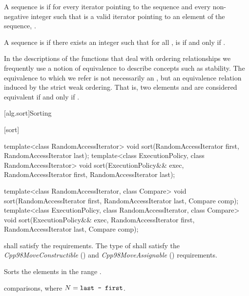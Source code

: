 \pnum
A sequence is
 if for every iterator
pointing to the sequence and every non-negative integer
such that
is a valid iterator pointing to an element of the sequence,
.

\pnum
A sequence
is
if there exists an integer
such that for all
,
is  if and only if
.

\pnum
In the descriptions of the functions that deal with ordering relationships we frequently use a notion of
equivalence to describe concepts such as stability.
The equivalence to which we refer is not necessarily an
,
but an equivalence relation induced by the strict weak ordering.
That is, two elements
and
are considered equivalent if and only if
.

[alg.sort]{Sorting}

[sort]{}

%
\begin{itemdecl}
template<class RandomAccessIterator>
  void sort(RandomAccessIterator first, RandomAccessIterator last);
template<class ExecutionPolicy, class RandomAccessIterator>
  void sort(ExecutionPolicy&& exec,
            RandomAccessIterator first, RandomAccessIterator last);

template<class RandomAccessIterator, class Compare>
  void sort(RandomAccessIterator first, RandomAccessIterator last,
            Compare comp);
template<class ExecutionPolicy, class RandomAccessIterator, class Compare>
  void sort(ExecutionPolicy&& exec,
            RandomAccessIterator first, RandomAccessIterator last,
            Compare comp);
\end{itemdecl}

\begin{itemdescr}
\pnum
\requires
{} shall satisfy the
 requirements. The type
of  shall satisfy the
\textit{Cpp98MoveConstructible} () and
\textit{Cpp98MoveAssignable} () requirements.

\pnum
\effects
Sorts the elements in the range
.

\pnum
\complexity
{} comparisons, where $N = \texttt{last - first}$.
\end{itemdescr}

